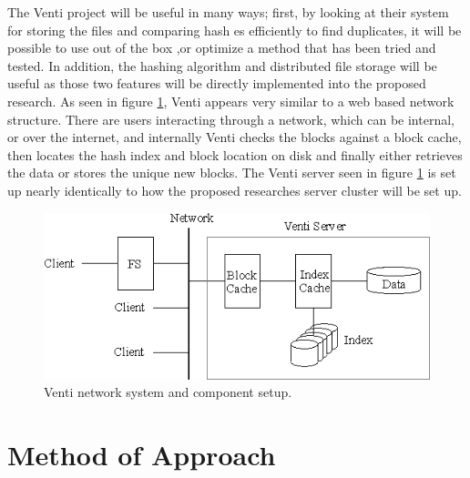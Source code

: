 \documentclass[11pt]{article}
\begin{document}
The Venti project will be useful in many ways; first, by looking at their system for storing the files and comparing hash es efficiently to find duplicates, it will be possible to use out of the box ,or optimize a method that has been tried and tested. In addition, the hashing algorithm and distributed file storage will be useful as those two features will be directly implemented into the proposed research. As seen in figure \ref{fig:venti}, Venti appears very similar to a web based network structure. There are users interacting through a network, which can be internal, or over the internet, and internally Venti checks the blocks against a block cache, then locates the hash index and block location on disk and finally either retrieves the data or stores the unique new blocks. The Venti server seen in figure \ref{fig:venti} is set up nearly identically to how the proposed researches server cluster will be set up.

\begin{figure}
\begin{center}
\includegraphics[scale=.7]{venti_prop}
\caption{\label{fig:venti} Venti network system and component setup.}
\end{center}
\end{figure}

\vspace*{-.2in}
\section{Method of Approach}
\label{sec:method}
\vspace*{-.1in}
\end{document}
